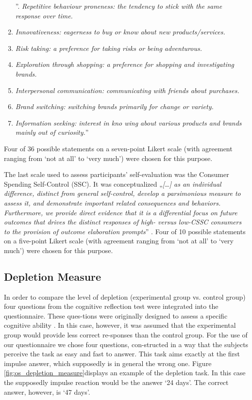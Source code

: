 \begin{enumerate}[label=\emph{\alph*}.]
\item [”\stepcounter{enumi}\emph{\alph{enumi}}.]\emph{Repetitive behaviour proneness: the tendency to stick with the same response over time. }
\item \emph{Innovativeness: eagerness to buy or know about new products/services. }
\item \emph{Risk taking: a preference for taking risks or being adventurous. }
\item \emph{Exploration through shopping: a preference for shopping and investigating brands. }
\item \emph{Interpersonal communication: communicating with friends about purchases. }
\item \emph{Brand switching: switching brands primarily for change or variety. }
\item \emph{Information seeking: interest in kno wing about various products and brands mainly out of curiosity.}” \citep{raju1980optimum}
\end{enumerate}
Four of 36 possible statements on a seven-point Likert scale (with agreement ranging from ‘not at all’ to ‘very much’) were chosen for this purpose.\par
The last scale used to assess participants’ self-evaluation was the Consumer Spending Self-Control (SSC). It was conceptualized „\emph{[\ldots] as an individual difference, distinct from general self-control, develop a parsimonious measure to assess it, and demonstrate important related consequences and behaviors. Furthermore, we provide direct evidence that it is a differential focus on future outcomes that drives the distinct responses of high- versus low-CSSC consumers to the provision of outcome elaboration prompts}” \citep{haws2012consumer}. Four of 10 possible statements on a five-point Likert scale (with agreement ranging from ‘not at all’ to ‘very much’) were chosen for this purpose.\par

\subsection{Depletion Measure}
In order to compare the level of depletion (experimental group vs. control group) four questions from the cognitive reflection test were integrated into the questionnaire. These ques-tions were originally designed to assess a specific cognitive ability \citep{frederick2005cognitive}. In this case, however, it was assumed that the experimental group would provide less correct re-sponses than the control group. For the use of our questionnaire we chose four questions, con-structed in a way that the subjects perceive the task as easy and fast to answer. This task aims exactly at the first impulse answer, which supposedly is in general the wrong one.  Figure \ref{fig:os_depletion_measure}displays an example of the depletion task. In this case the supposedly impulse reaction would be the answer ‘24 days’. The correct answer, however, is ‘47 days’.  \par

